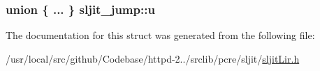 \subsubsection[{\texorpdfstring{u}{u}}]{\setlength{\rightskip}{0pt plus 5cm}union \{ ... \}   sljit\+\_\+jump\+::u}\hypertarget{structsljit__jump_a1aa68323d426c90b4359285a35b5a414}{}\label{structsljit__jump_a1aa68323d426c90b4359285a35b5a414}


The documentation for this struct was generated from the following file\+:\begin{DoxyCompactItemize}
\item 
/usr/local/src/github/\+Codebase/httpd-\/2../srclib/pcre/sljit/\hyperlink{sljitLir_8h}{sljit\+Lir.\+h}\end{DoxyCompactItemize}
